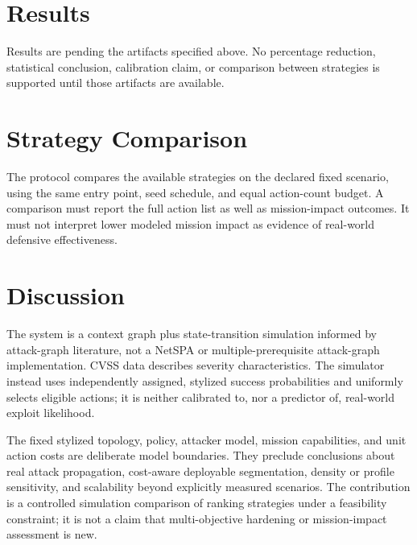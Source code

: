 \section{Results}

Results are pending the artifacts specified above. No percentage reduction, statistical conclusion, calibration claim, or comparison between strategies is supported until those artifacts are available.

\section{Strategy Comparison}

The protocol compares the available strategies on the declared fixed scenario, using the same entry point, seed schedule, and equal action-count budget. A comparison must report the full action list as well as mission-impact outcomes. It must not interpret lower modeled mission impact as evidence of real-world defensive effectiveness.

\section{Discussion}

The system is a context graph plus state-transition simulation informed by attack-graph literature, not a NetSPA or multiple-prerequisite attack-graph implementation. CVSS data describes severity characteristics. The simulator instead uses independently assigned, stylized success probabilities and uniformly selects eligible actions; it is neither calibrated to, nor a predictor of, real-world exploit likelihood.

The fixed stylized topology, policy, attacker model, mission capabilities, and unit action costs are deliberate model boundaries. They preclude conclusions about real attack propagation, cost-aware deployable segmentation, density or profile sensitivity, and scalability beyond explicitly measured scenarios. The contribution is a controlled simulation comparison of ranking strategies under a feasibility constraint; it is not a claim that multi-objective hardening or mission-impact assessment is new.
